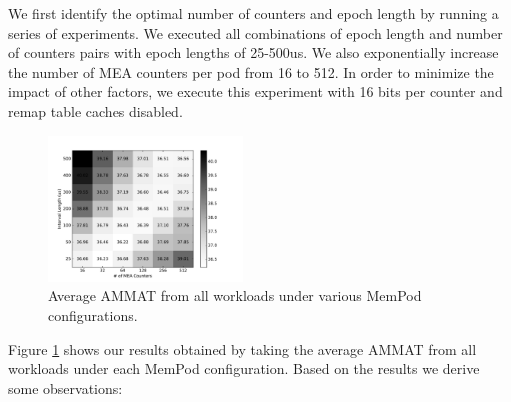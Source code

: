 We first identify the optimal number of counters and epoch length by running a series of experiments. We executed all combinations of epoch length and number of counters pairs with epoch lengths of 25-500us.
We also exponentially increase the number of MEA counters per pod from 16 to 512. In order to minimize the impact of other factors, we execute this experiment with 16 bits per counter and remap table caches disabled. 

\begin{figure}[h]
	\centering
  \includegraphics[width=0.46\textwidth]{figures/revised/new/DSE.pdf}
  \caption{Average AMMAT from all workloads under various MemPod configurations.}
  \label{fig:dse}
\end{figure}

Figure \ref{fig:dse} shows our results obtained by taking the average AMMAT from all workloads under each MemPod configuration. Based on the results we derive some observations:

